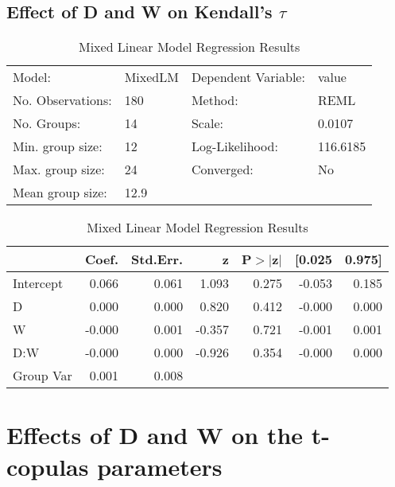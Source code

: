 \documentclass{article}
\begin{document}
\subsection{Effect of D and W on Kendall's $\tau$}
\begin{table}
    \caption{Mixed Linear Model Regression Results}
    \label{}
    \begin{center}
    \begin{tabular}{llll}
    \hline
    Model:            & MixedLM & Dependent Variable: & value     \\
    No. Observations: & 180     & Method:             & REML      \\
    No. Groups:       & 14      & Scale:              & 0.0107    \\
    Min. group size:  & 12      & Log-Likelihood:     & 116.6185  \\
    Max. group size:  & 24      & Converged:          & No        \\
    Mean group size:  & 12.9    &                     &           \\
    \hline
    \end{tabular}
    \end{center}
    
    \begin{center}
    \begin{tabular}{lrrrrrr}
    \hline
              &  Coef. & Std.Err. &      z & P$> |$z$|$ & [0.025 & 0.975]  \\
    \hline
    Intercept &  0.066 &    0.061 &  1.093 &       0.275 & -0.053 &  0.185  \\
    D         &  0.000 &    0.000 &  0.820 &       0.412 & -0.000 &  0.000  \\
    W         & -0.000 &    0.001 & -0.357 &       0.721 & -0.001 &  0.001  \\
    D:W       & -0.000 &    0.000 & -0.926 &       0.354 & -0.000 &  0.000  \\
    Group Var &  0.001 &    0.008 &        &             &        &         \\
    \hline
    \end{tabular}
    \end{center}
    \end{table}
    

\section{Effects of D and W on the t-copulas parameters}
\end{document}
